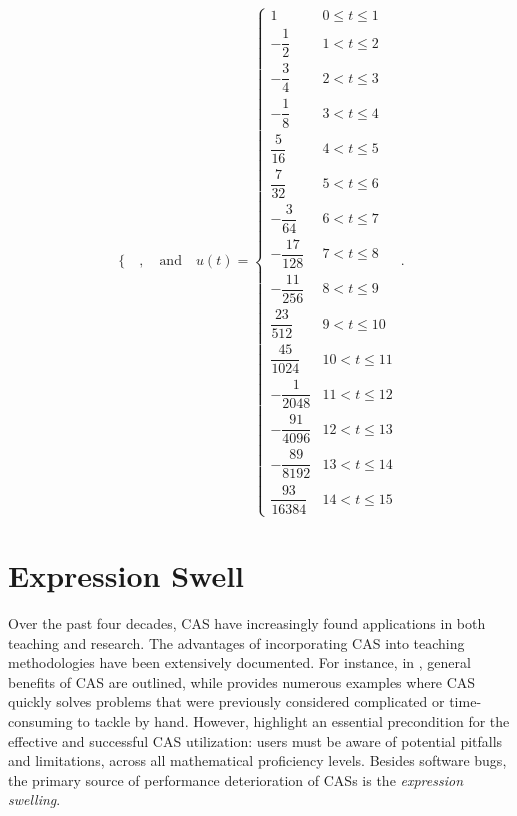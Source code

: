 \begin{example}
\begin{equation}
\begin{cases}
  \end{cases},
  \quad \text{and} \quad u(t) = \begin{cases}
    1 & 0\leq t\leq 1 \\[0.1em]
    -\dfrac{1}{2} & 1<t\leq 2 \\[0.1em]
    -\dfrac{3}{4} & 2<t\leq 3 \\[0.1em]
    -\dfrac{1}{8} & 3<t\leq 4 \\[0.1em]
    \dfrac{5}{16} & 4<t\leq 5 \\[0.1em]
    \dfrac{7}{32} & 5<t\leq 6 \\[0.1em]
    -\dfrac{3}{64} & 6<t\leq 7 \\[0.1em]
    -\dfrac{17}{128} & 7<t\leq 8 \\[0.1em]
    -\dfrac{11}{256} & 8<t\leq 9 \\[0.1em]
    \dfrac{23}{512} & 9<t\leq 10 \\[0.1em]
    \dfrac{45}{1024} & 10<t\leq 11 \\[0.1em]
    -\dfrac{1}{2048} & 11<t\leq 12 \\[0.1em]
    -\dfrac{91}{4096} & 12<t\leq 13 \\[0.1em]
    -\dfrac{89}{8192} & 13<t\leq 14 \\[0.1em]
    \dfrac{93}{16384} & 14<t\leq 15
  \end{cases} \, \text{.}
\end{equation}
\end{example}


\section{Expression Swell}
\label{chap2:sec:expression_swell}

Over the past four decades, \ac{CAS} have increasingly found applications in both teaching and research. The advantages of incorporating \ac{CAS} into teaching methodologies have been extensively documented. For instance, in \citet{stoutemyer1984radical}, general benefits of \ac{CAS} are outlined, while \citet{pavelle1985macsyma} provides numerous examples where \ac{CAS} quickly solves problems that were previously considered complicated or time-consuming to tackle by hand. However, \citet{mitic1994pitfalls} highlight an essential precondition for the effective and successful \ac{CAS} utilization: users must be aware of potential pitfalls and limitations, across all mathematical proficiency levels. Besides software bugs, the primary source of performance deterioration of \acp{CAS} is the \emph{expression swelling}.

